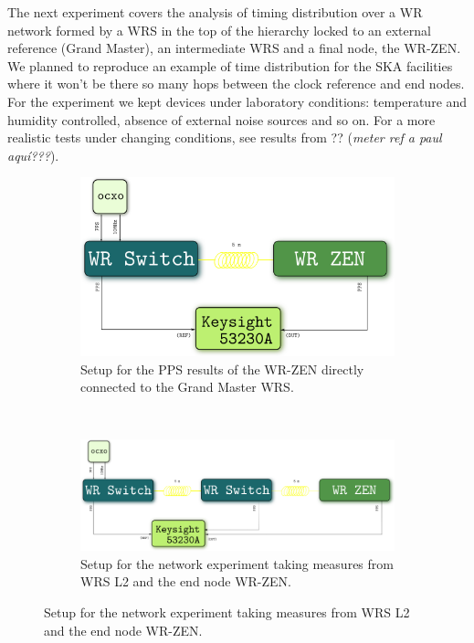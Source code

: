 The next experiment covers the analysis of timing distribution over a WR network formed by a WRS in the top of the hierarchy locked to an external reference (Grand Master), an intermediate WRS and a final node, the WR-ZEN. We planned to reproduce an example of time distribution for the SKA facilities where it won't be there so many hops between the clock reference and end nodes. For the experiment we kept devices under laboratory conditions: temperature and humidity controlled, absence of external noise sources and so on. For a more realistic tests under changing conditions, see results from ?? (\textit{meter ref a paul aquí???}).

\begin{figure}
    \begin{subfigure}[t]{.35\textwidth}
        \centering
        \includegraphics[width=\textwidth]{img/prueba1_pps.png}
        \caption{Setup for the PPS results of the WR-ZEN directly connected to the Grand Master WRS.}
        \label{fig:prueba1_sch}
    \end{subfigure}
    ~
    \begin{subfigure}[t]{.60\textwidth}
        \centering
        \includegraphics[width=\textwidth]{img/prueba2-3_pps.png}
        \caption{Setup for the network experiment taking measures from WRS L2 and the end node WR-ZEN.}
        \label{fig:prueba2_sch}
    \end{subfigure}
\end{figure}

